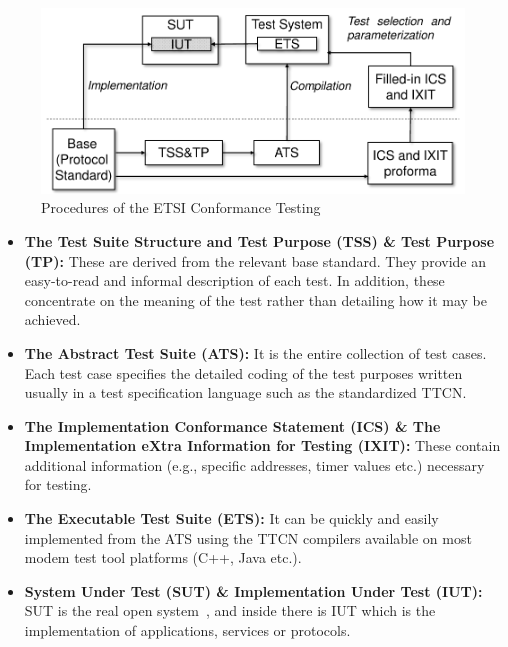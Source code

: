 \begin{figure}[tb!]
\centering
\includegraphics[width=\textwidth]{figures/fig_conformance_testing_procedures.pdf}
\caption{Procedures of the ETSI Conformance Testing}
\label{fig:procedures_of_the_conformance_testing}
\end{figure}

\begin{itemize}
  \item \textbf{The Test Suite Structure and Test Purpose (TSS) \& Test Purpose (TP):} These are derived from the relevant base standard. They provide an easy-to-read and informal description of each test. In addition,  these concentrate on the meaning of the test rather than detailing how it may be achieved.
  
  \item \textbf{The Abstract Test Suite (ATS):} It is the entire collection of test cases. Each test case specifies the detailed coding of the test purposes written usually in a test specification language such as the standardized TTCN.

  \item \textbf{The Implementation Conformance Statement (ICS) \& The Implementation eXtra Information for Testing (IXIT): } These contain additional information (e.g., specific addresses, timer values etc.) necessary for testing.
  
  \item \textbf{The Executable Test Suite (ETS): } It can be quickly and easily implemented from the ATS using the TTCN compilers available on most modem test tool platforms (C++, Java etc.).
  
  \item \textbf{System Under Test (SUT) \& Implementation Under Test (IUT): } SUT is the real open system~\cite{2016etsitestingspec}, and inside there is IUT which is the implementation of applications, services or protocols.
\end{itemize}

